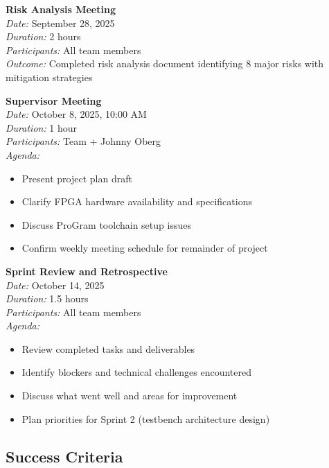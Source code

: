 \documentclass[10pt]{article}
\begin{document}
\noindent\textbf{Risk Analysis Meeting}\\
\textit{Date:}  September 28, 2025\\
\textit{Duration:} 2 hours\\
\textit{Participants:} All team members\\
\textit{Outcome:} Completed risk analysis document identifying 8 major risks with mitigation strategies

\noindent\textbf{Supervisor Meeting}\\
\textit{Date:}  October 8, 2025, 10:00 AM\\
\textit{Duration:} 1 hour\\
\textit{Participants:} Team + Johnny Oberg\\
\textit{Agenda:}
\begin{itemize}
    \item Present project plan draft
    \item Clarify FPGA hardware availability and specifications
    \item Discuss ProGram toolchain setup issues
    \item Confirm weekly meeting schedule for remainder of project
\end{itemize}

\noindent\textbf{Sprint Review and Retrospective}\\
\textit{Date:} October 14, 2025\\
\textit{Duration:} 1.5 hours\\
\textit{Participants:} All team members\\
\textit{Agenda:}
\begin{itemize}
    \item Review completed tasks and deliverables
    \item Identify blockers and technical challenges encountered
    \item Discuss what went well and areas for improvement
    \item Plan priorities for Sprint 2 (testbench architecture design)
\end{itemize}

\subsection{Success Criteria}
\end{document}
